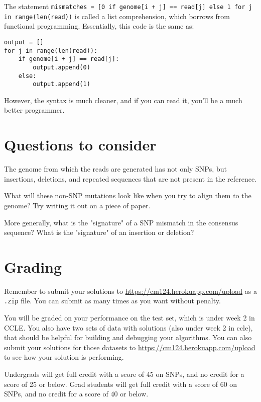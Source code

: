\documentclass{article}
\begin{document}
The statement \verb~mismatches = [0 if genome[i + j] == read[j] else 1 for j in range(len(read))~ is called a list comprehension, which borrows from functional programming. Essentially, this code is the same as:

\begin{verbatim}
output = []
for j in range(len(read)):
	if genome[i + j] == read[j]:
		output.append(0)
	else:
		output.append(1)
\end{verbatim}

However, the syntax is much cleaner, and if you can read it, you'll be a much better programmer.

\section*{Questions to consider}
The genome from which the reads are generated has not only SNPs, but insertions, deletions, and repeated sequences that are not present in the reference. 

What will these non-SNP mutations look like when you try to align them to the genome? Try writing it out on a piece of paper. 

More generally, what is the "signature" of a SNP mismatch in the consensus sequence?  What is the "signature" of an insertion or deletion?




\section*{Grading}

Remember to submit your solutions to \url{https://cm124.herokuapp.com/upload} as a \verb|.zip| file. You can submit as many times as you want without penalty.

You will be graded on your performance on the test set, which is under week 2 in CCLE. You also have two sets of data with solutions (also under week 2 in ccle), that should be helpful for building and debugging your algorithms. You can also submit your solutions for those datasets to \url{https://cm124.herokuapp.com/upload} to see how your solution is performing.

Undergrads will get full credit with a score of 45 on SNPs, and no credit for a score of 25 or below.  Grad students will get full credit with a score of 60 on SNPs, and no credit for a score of 40 or below.
\end{document}
